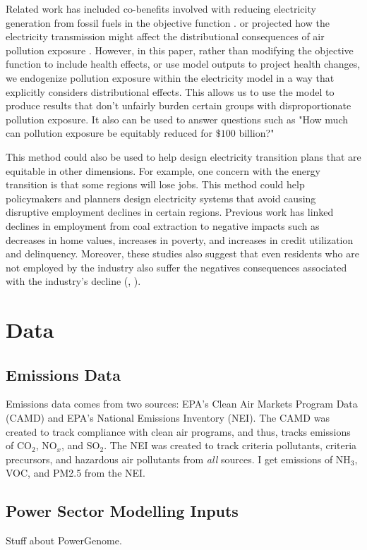 \documentclass[a4paper]{article}
\theoremstyle{definition}
\theoremstyle{plain}
\begin{document}
Related work has included co-benefits involved with reducing electricity generation from fossil fuels in the objective function \citet{Sergi2020OptimizingBenefits}.
or projected how the electricity transmission might affect the distributional consequences of air pollution exposure \citep{Goforth2022AirStrategies}. However, in this paper, rather than modifying the objective function to include health effects, or use model outputs to project health changes, we endogenize pollution exposure within the electricity model in a way that explicitly considers distributional effects.  This allows us to use the model to produce results that don't unfairly burden certain groups with disproportionate pollution exposure.  It also can be used to answer questions such as "How much can pollution exposure be equitably reduced for $\$100$ billion?" 

This method could also be used to help design electricity transition plans that are equitable in other dimensions.  For example, one concern with the energy transition is that some regions will lose jobs.  This method could help policymakers and planners design electricity systems that avoid causing disruptive employment declines in certain regions. Previous work has linked declines in employment from  coal extraction to negative impacts such as decreases in home values, increases in poverty, and increases in credit utilization and delinquency. Moreover, these studies also suggest that even residents who are not employed by the industry also suffer the negatives consequences associated with the industry's decline (\citet{Kraynak2023TheCountry}, \citet{Blonz2023TheFuels}). 

\section{Data}
\subsection{Emissions Data}
Emissions data comes from two sources: EPA's Clean Air Markets Program Data (CAMD) and EPA's National Emissions Inventory (NEI).  The CAMD was created to track compliance with clean air programs, and thus, tracks emissions of CO$_2$, NO$_x$, and SO$_2$.  The NEI was created to track criteria pollutants, criteria precursors, and hazardous air pollutants from \textit{all} sources.  I get emissions of NH$_3$, VOC, and PM2.5 from the NEI. 

\subsection{Power Sector Modelling Inputs}
Stuff about PowerGenome.
\end{document}
